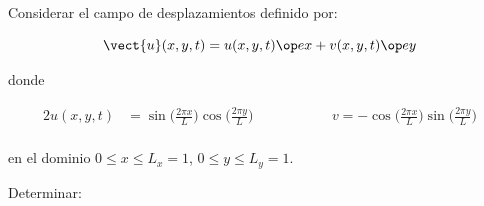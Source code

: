 \documentclass[./../main.tex]{subfiles}
\begin{document}
    \section{}

    Considerar el campo de desplazamientos definido por:

    \begin{equation*}
        \vect{u}(x, y, t) = u(x, y, t)\ex + v(x, y, t)\ey
    \end{equation*}

    donde

    \begin{alignat*}{2}
        u(x, y, t) &= \sin\bigl(\tfrac{2\pi x}{L}\bigr)\cos\bigl(\tfrac{2\pi y}{L}\bigr) &\qquad\qquad & v = -\cos\bigl(\tfrac{2\pi x}{L}\bigr)\sin\bigl(\tfrac{2\pi y}{L}\bigr) \\
    \end{alignat*}

    en el dominio \(0 \leq x \leq L_{x} = 1\), \(0 \leq y \leq L_{y} = 1\).
    
    Determinar:
\end{document}
